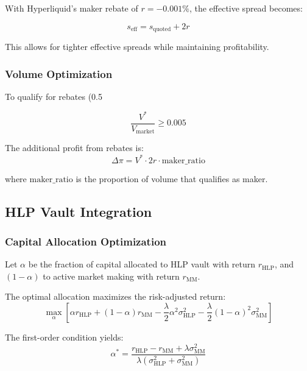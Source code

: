 \documentclass[11pt,a4paper]{article}
\theoremstyle{definition}
\begin{document}
With Hyperliquid's maker rebate of $r = -0.001\%$, the effective spread becomes:

\begin{equation}
s_{\text{eff}} = s_{\text{quoted}} + 2r
\end{equation}

This allows for tighter effective spreads while maintaining profitability.

\subsubsection{Volume Optimization}

To qualify for rebates (0.5%

\begin{equation}
\frac{V^*}{V_{\text{market}}} \geq 0.005
\end{equation}

The additional profit from rebates is:
\begin{equation}
\Delta \pi = V^* \cdot 2r \cdot \text{maker\_ratio}
\end{equation}

where $\text{maker\_ratio}$ is the proportion of volume that qualifies as maker.

\subsection{HLP Vault Integration}

\subsubsection{Capital Allocation Optimization}

Let $\alpha$ be the fraction of capital allocated to HLP vault with return $r_{\text{HLP}}$, and $(1-\alpha)$ to active market making with return $r_{\text{MM}}$.

The optimal allocation maximizes the risk-adjusted return:
\begin{equation}\label{eq:allocation}
\max_{\alpha} \left[\alpha r_{\text{HLP}} + (1-\alpha) r_{\text{MM}} - \frac{\lambda}{2} \alpha^2 \sigma_{\text{HLP}}^2 - \frac{\lambda}{2} (1-\alpha)^2 \sigma_{\text{MM}}^2\right]
\end{equation}

The first-order condition yields:
\begin{equation}
\alpha^* = \frac{r_{\text{HLP}} - r_{\text{MM}} + \lambda \sigma_{\text{MM}}^2}{\lambda (\sigma_{\text{HLP}}^2 + \sigma_{\text{MM}}^2)}
\end{equation}
\end{document}
